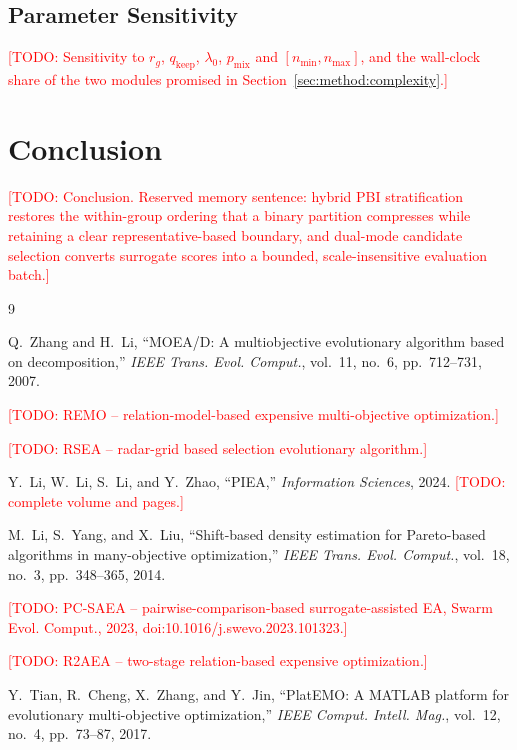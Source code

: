 \documentclass[final,5p,times,twocolumn]{elsarticle}
\newcommand{\TODO}[1]{\textcolor{red}{[TODO: #1]}}
\begin{document}
\subsection{Parameter Sensitivity}
\label{sec:exp:sensitivity}
\TODO{Sensitivity to $r_g$, $q_{\mathrm{keep}}$, $\lambda_0$, $p_{\mathrm{mix}}$
and $[n_{\min},n_{\max}]$, and the wall-clock share of the two modules promised
in Section~\ref{sec:method:complexity}.}

\section{Conclusion}
\label{sec:conclusion}
\TODO{Conclusion. Reserved memory sentence: hybrid PBI stratification restores
the within-group ordering that a binary partition compresses while retaining a
clear representative-based boundary, and dual-mode candidate selection converts
surrogate scores into a bounded, scale-insensitive evaluation batch.}

\begin{thebibliography}{9}

Q.~Zhang and H.~Li,
``MOEA/D: A multiobjective evolutionary algorithm based on decomposition,''
\emph{IEEE Trans. Evol. Comput.}, vol.~11, no.~6, pp.~712--731, 2007.

\TODO{REMO -- relation-model-based expensive multi-objective optimization.}

\TODO{RSEA -- radar-grid based selection evolutionary algorithm.}

Y.~Li, W.~Li, S.~Li, and Y.~Zhao,
``PIEA,'' \emph{Information Sciences}, 2024.
\TODO{complete volume and pages.}

M.~Li, S.~Yang, and X.~Liu,
``Shift-based density estimation for Pareto-based algorithms in
many-objective optimization,''
\emph{IEEE Trans. Evol. Comput.}, vol.~18, no.~3, pp.~348--365, 2014.

\TODO{PC-SAEA -- pairwise-comparison-based surrogate-assisted EA,
Swarm Evol. Comput., 2023, doi:10.1016/j.swevo.2023.101323.}

\TODO{R2AEA -- two-stage relation-based expensive optimization.}

Y.~Tian, R.~Cheng, X.~Zhang, and Y.~Jin,
``PlatEMO: A MATLAB platform for evolutionary multi-objective optimization,''
\emph{IEEE Comput. Intell. Mag.}, vol.~12, no.~4, pp.~73--87, 2017.

\end{thebibliography}
\end{document}

